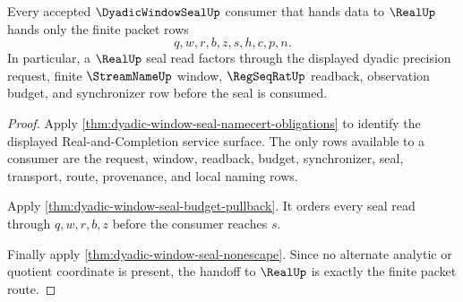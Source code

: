 \begin{theorem}
\label{thm:dyadic-window-seal-real-handoff}
Every accepted $\DyadicWindowSealUp$ consumer that hands data to $\RealUp$ hands only the finite packet rows
$$
q,w,r,b,z,s,h,c,p,n.
$$
In particular, a $\RealUp$ seal read factors through the displayed dyadic precision request, finite $\StreamNameUp$ window, $\RegSeqRatUp$ readback, observation budget, and synchronizer row before the seal is consumed.
\end{theorem}
\begin{proof}
Apply \autoref{thm:dyadic-window-seal-namecert-obligations} to identify the displayed Real-and-Completion service surface. The only rows available to a consumer are the request, window, readback, budget, synchronizer, seal, transport, route, provenance, and local naming rows.

Apply \autoref{thm:dyadic-window-seal-budget-pullback}. It orders every seal read through $q,w,r,b,z$ before the consumer reaches $s$.

Finally apply \autoref{thm:dyadic-window-seal-nonescape}. Since no alternate analytic or quotient coordinate is present, the handoff to $\RealUp$ is exactly the finite packet route.
\end{proof}

